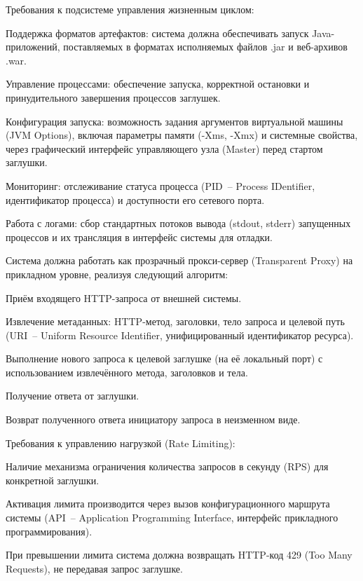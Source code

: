 
Требования к подсистеме управления жизненным циклом:

\begin{compactlist}
\item Поддержка форматов артефактов: система должна обеспечивать запуск Java-приложений, поставляемых в форматах исполняемых файлов .jar и веб-архивов .war.
\item Управление процессами: обеспечение запуска, корректной остановки и принудительного завершения процессов заглушек.
\item Конфигурация запуска: возможность задания аргументов виртуальной машины (JVM Options), включая параметры памяти (-Xms, -Xmx) и системные свойства, через графический интерфейс управляющего узла (Master) перед стартом заглушки.
\item Мониторинг: отслеживание статуса процесса (PID~-- Process IDentifier, идентификатор процесса) и доступности его сетевого порта.
\item Работа с логами: сбор стандартных потоков вывода (stdout, stderr) запущенных процессов и их трансляция в интерфейс системы для отладки.
\end{compactlist}

Система должна работать как прозрачный прокси-сервер (Transparent Proxy) на прикладном уровне, реализуя следующий алгоритм:

\begin{compactlist}
\item Приём входящего HTTP-запроса от внешней системы.
\item Извлечение метаданных: HTTP-метод, заголовки, тело запроса и целевой путь (URI~-- Uniform Resource Identifier, унифицированный идентификатор ресурса).
\item Выполнение нового запроса к целевой заглушке (на её локальный порт) с использованием извлечённого метода, заголовков и тела.
\item Получение ответа от заглушки.
\item Возврат полученного ответа инициатору запроса в неизменном виде.
\end{compactlist}

Требования к управлению нагрузкой (Rate Limiting):

\begin{compactlist}
\item Наличие механизма ограничения количества запросов в секунду (RPS) для конкретной заглушки.
\item Активация лимита производится через вызов конфигурационного маршрута системы (API~-- Application Programming Interface, интерфейс прикладного программирования).
\item При превышении лимита система должна возвращать HTTP-код 429 (Too Many Requests), не передавая запрос заглушке.
\end{compactlist}

